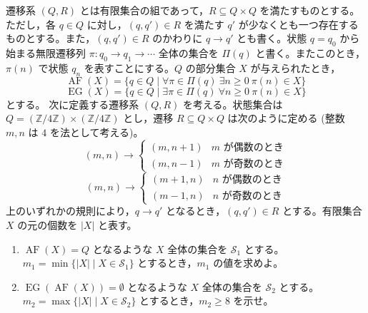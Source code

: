 \documentclass[12pt]{jlreq}
\newcommand{\AF}{\operatorname{AF}}
\newcommand{\EG}{\operatorname{EG}}
\begin{document}
遷移系 $(Q, R)$ とは有限集合の組であって，$R \subseteq Q \times Q$ を満たすものとする。ただし，各 $q \in Q$ に対し，$(q, q') \in R$ を満たす $q'$ が少なくとも一つ存在するものとする。また，$(q, q') \in R$ のかわりに $q \to q'$ とも書く。状態 $q = q_0$ から始まる無限遷移列 $\pi : q_0 \to q_1 \to \cdots$ 全体の集合を $\Pi(q)$ と書く。またこのとき，$\pi(n)$ で状態 $q_n$ を表すことにする。$Q$ の部分集合 $X$ が与えられたとき，
\[
  \AF(X) = \{ q \in Q \mid \forall \pi \in \Pi(q)\ \exists n \ge 0\ \pi(n) \in X \}
\]
\[
  \EG(X) = \{ q \in Q \mid \exists \pi \in \Pi(q)\ \forall n \ge 0\ \pi(n) \in X \}
\]
とする。
次に定義する遷移系 $(Q, R)$ を考える。状態集合は $Q = (\mathbb{Z}/4\mathbb{Z}) \times (\mathbb{Z}/4\mathbb{Z})$ とし，遷移 $R \subseteq Q \times Q$ は次のように定める (整数 $m, n$ は $4$ を法として考える)。
\[
  (m,n) \to \begin{cases} (m, n+1) & \text{$m$ が偶数のとき} \\ (m, n-1) & \text{$m$ が奇数のとき} \end{cases}
\]
\[
  (m,n) \to \begin{cases} (m+1, n) & \text{$n$ が偶数のとき} \\ (m-1, n) & \text{$n$ が奇数のとき} \end{cases}
\]
上のいずれかの規則により，$q \to q'$ となるとき，$(q, q') \in R$ とする。有限集合 $X$ の元の個数を $|X|$ と表す。

\begin{enumerate}
  \item $\AF(X) = Q$ となるような $X$ 全体の集合を $\mathcal{S}_1$ とする。$m_1 = \min\{ |X| \mid X \in \mathcal{S}_1 \}$ とするとき，$m_1$ の値を求めよ。
  \item $\EG(\AF(X)) = \emptyset$ となるような $X$ 全体の集合を $\mathcal{S}_2$ とする。$m_2 = \max\{ |X| \mid X \in \mathcal{S}_2 \}$ とするとき，$m_2 \ge 8$ を示せ。
\end{enumerate}
\end{document}
